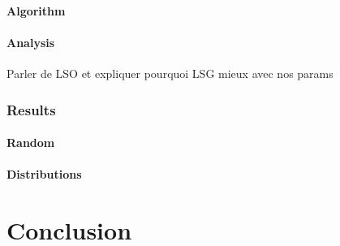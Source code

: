 \documentclass[a4paper,10pt]{article}
\begin{document}
	\paragraph{Algorithm}
	\paragraph{Analysis}
	  Parler de LSO et expliquer pourquoi LSG mieux avec nos params
     \subsubsection{Results}
	 \paragraph{Random}
	 \paragraph{Distributions}
   
\section{Conclusion}



\end{document}
